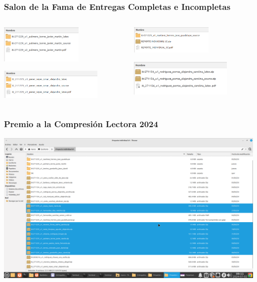 \begin{frame}
\frametitle{Salon de la Fama de Entregas Completas e Incompletas}
\begin{columns}
\begin{column}{0.5\textwidth}
\begin{center}
\includegraphics[width=4cm]{Entregables/CasoBien.png}

\includegraphics[width=5cm]{Entregables/CasoBien2.png}
\end{center}

\end{column}
\begin{column}{0.5\textwidth}
\begin{center}
\includegraphics[width=4cm]{Entregables/CasoMal1.png}

\includegraphics[width=5cm]{Entregables/CasoMal2.png}
\end{center}

\end{column}
\end{columns}
\end{frame}



\begin{frame}
\frametitle{Premio a la Compresión Lectora 2024}
\begin{center}
\includegraphics[width=0.75\linewidth]{Entregables/PremioAlaComprensionLectora_2024.png}
\end{center}

\end{frame}




